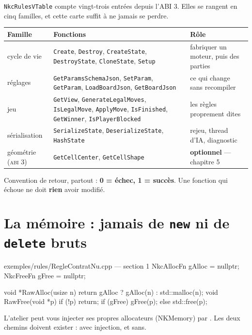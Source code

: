 \texttt{NkcRulesVTable} compte vingt-trois entrées depuis l'ABI 3. Elles se
rangent en cinq familles, et cette carte suffit à ne jamais se perdre.

\begin{center}
\begin{tabular}{@{}p{2.9cm}p{6.4cm}p{4.5cm}@{}}
\toprule
\textbf{Famille} & \textbf{Fonctions} & \textbf{Rôle} \\
\midrule
cycle de vie & \texttt{Create}, \texttt{Destroy}, \texttt{CreateState},
  \texttt{DestroyState}, \texttt{CloneState}, \texttt{Setup} & fabriquer un
  moteur, puis des parties \\
réglages & \texttt{GetParamsSchemaJson}, \texttt{SetParam}, \texttt{GetParam},
  \texttt{LoadBoardJson}, \texttt{GetBoardJson} & ce qui change sans recompiler \\
jeu & \texttt{GetView}, \texttt{GenerateLegalMoves}, \texttt{IsLegalMove},
  \texttt{ApplyMove}, \texttt{IsFinished}, \texttt{GetWinner},
  \texttt{IsPlayerBlocked} & les règles proprement dites \\
sérialisation & \texttt{SerializeState}, \texttt{DeserializeState},
  \texttt{HashState} & rejeu, thread d'IA, diagnostic \\
géométrie \textsc{(abi 3)} & \texttt{GetCellCenter}, \texttt{GetCellShape} &
  \textbf{optionnel} — chapitre 5 \\
\bottomrule
\end{tabular}
\end{center}

\begin{nkretenir}
Convention de retour, partout : \textbf{0 = échec, 1 = succès}. Une fonction qui
échoue ne doit \textbf{rien} avoir modifié.
\end{nkretenir}

\section{La mémoire : jamais de \texttt{new} ni de \texttt{delete} bruts}

\begin{nkcode}{exemples/rules/RegleContratNu.cpp — section 1}
NkcAllocFn gAlloc = nullptr;
NkcFreeFn  gFree  = nullptr;

void *RawAlloc(usize n) { return gAlloc ? gAlloc(n) : std::malloc(n); }
void  RawFree(void *p)  { if (!p) return; if (gFree) gFree(p); else std::free(p); }
\end{nkcode}

L'atelier peut vous injecter ses propres allocateurs (NKMemory) par
. Les deux chemins doivent exister : avec
injection, et sans.

